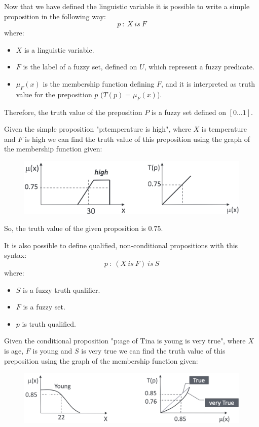 \documentclass[12pt, a4paper]{report}
\newtheorem[style=M,bodystyle=\normalfont]{theorem}{Theorem}
\newtheorem[style=M,bodystyle=\normalfont]{corollary}{Corollary}
\newtheorem[style=M,bodystyle=\normalfont]{lemma}{Lemma}
\newtheorem[style=M,bodystyle=\normalfont]{definition}{Definition}
\begin{document}
    Now that we have defined the linguistic variable it is possible to write a simple proposition in the following way: 
    \[p\: : \: X \: is \: F\]
    where:
    \begin{itemize}
        \item $X$ is a linguistic variable.
        \item $F$ is the label of a fuzzy set, defined on $U$, which represent a fuzzy predicate.
        \item $\mu_F(x)$ is the membership function defining $F$, and it is interpreted as truth value for the preposition $p$ ($T(p)=\mu_F(x)$).
    \end{itemize}
    Therefore, the truth value of the preposition $P$ is a fuzzy set defined on $[0 \dots 1]$.
    \begin{example}
        Given the simple proposition "p:temperature is high", where $X$ is temperature and $F$ is high we can find the truth value of this 
        preposition using the graph of the membership function given:
        \begin{figure}[H]
            \centering
            \includegraphics[width=0.5\linewidth]{images/temperature.png}
        \end{figure}
        So, the truth value of the given proposition is $0.75$.
    \end{example}

    It is also possible to define qualified, non-conditional propositions with this syntax: 
    \[p \: : \: (X \: is \: F) \: is \: S\]
    where:
    \begin{itemize}
        \item $S$ is a fuzzy truth qualifier.
        \item $F$ is a fuzzy set.
        \item $p$ is truth qualified.
    \end{itemize}
    \begin{example}
        Given the conditional proposition "p:age of Tina is young is very true", where $X$ is age, $F$ is young and $S$ is very true we can 
        find the truth value of this preposition using the graph of the membership function given:
        \begin{figure}[H]
            \centering
            \includegraphics[width=0.75\linewidth]{images/age.png}
        \end{figure}
    \end{example}
\end{document}
